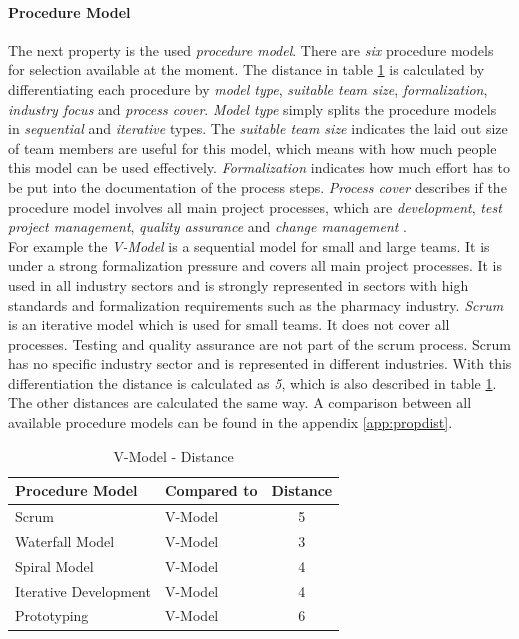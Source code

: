 \paragraph*{\textbf{Procedure Model}}
The next property is the used \textit{procedure model}. There are \textit{six} procedure models for selection available at the moment. The distance in table \ref{property:proceduremodel} is calculated by differentiating each procedure by \textit{model type}, \textit{suitable team size}, \textit{formalization}, \textit{industry focus} and \textit{process cover}. \textit{Model type} simply splits the procedure models in \textit{sequential} and \textit{iterative} types. The \textit{suitable team size} indicates the laid out size of team members are useful for this model, which means with how much people this model can be used effectively. \textit{Formalization} indicates how much effort has to be put into the documentation of the process steps. \textit{Process cover} describes if the procedure model involves all main project processes, which are \textit{development}, \textit{test project management}, \textit{quality assurance} and \textit{change management} \cite{incom}.\\
For example the \textit{V-Model} is a sequential model for small and large teams. It is under a strong formalization pressure and covers all main project processes. It is used in all industry sectors and is strongly represented in sectors with high standards and formalization requirements such as the pharmacy industry. \textit{Scrum} is an iterative model which is used for small teams. It does not cover all processes. Testing and quality assurance are not part of the scrum process. Scrum has no specific industry sector and is represented in different industries. With this differentiation the distance is calculated as \textit{5}, which is also described in table \ref{property:proceduremodel}. The other distances are calculated the same way. A comparison between all available procedure models can be found in the appendix \ref{app:propdist}.
\begin{table}[h]
	\centering 
	\setlength{\tabcolsep}{4pt}
	\begin{tabular}{|l|l|c|}\hline
		Procedure Model			& Compared to 	&  Distance 	\\ \hline
		Scrum   				& V-Model		& 5      		\\ \hline
		Waterfall Model   		& V-Model 		& 3      		\\ \hline
		Spiral Model   			& V-Model 		& 4     		\\ \hline
		Iterative Development   & V-Model 		& 4     		\\ \hline
		Prototyping  			& V-Model 		& 6     		\\ \hline
	\end{tabular} 
	\caption{V-Model - Distance} 
	\label{property:proceduremodel} 
\end{table}

